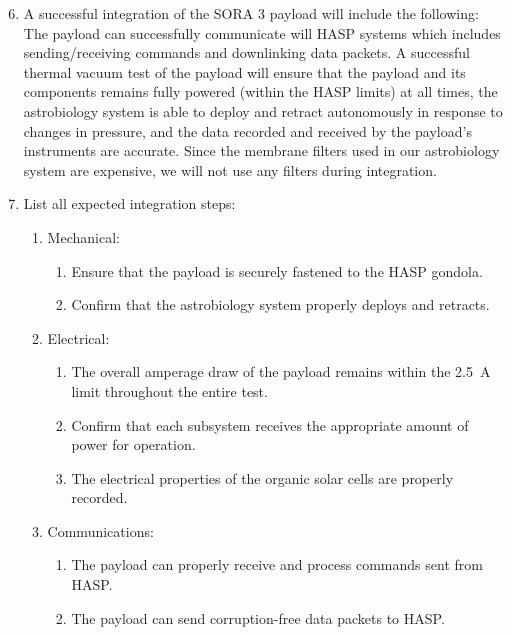 \begin{minipage}{\linewidth-0.5cm}
  \begin{enumerate}[label = \Alph*.] \setcounter{enumi}{5}
  \item A successful integration of the SORA 3 payload will include the following: \newline
    The payload can successfully communicate will HASP systems which includes sending/receiving commands and downlinking data packets. A successful thermal vacuum test of the payload will ensure that the payload and its components remains fully powered (within the HASP limits) at all times, the astrobiology system is able to deploy and retract autonomously in response to changes in pressure, and the data recorded and received by the payload's instruments are accurate. Since the membrane filters used in our astrobiology system are expensive, we will not use any filters during integration.    
  \item List all expected integration steps:
    \begin{enumerate}[label = -]
    \item Mechanical:
      \begin{enumerate}
      \item Ensure that the payload is securely fastened to the HASP gondola.
      \item Confirm that the astrobiology system properly deploys and retracts.
      \end{enumerate}
    \item Electrical:
      \begin{enumerate}
      \item The overall amperage draw of the payload remains within the \SI{2.5}{\ampere} limit throughout the entire test.
      \item Confirm that each subsystem receives the appropriate amount of power for operation.
      \item The electrical properties of the organic solar cells are properly recorded.
      \end{enumerate}
    \item Communications:
      \begin{enumerate}
      \item The payload can properly receive and process commands sent from HASP.
      \item The payload can send corruption-free data packets to HASP.

\end{enumerate}
\end{enumerate}
\end{enumerate}
\end{minipage}
